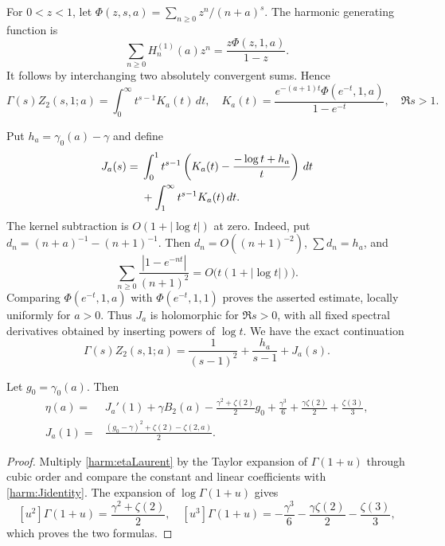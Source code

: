For $0<z<1$, let $\Phi(z,s,a)=\sum_{n\ge0}z^n/(n+a)^s$.
The harmonic generating function is
\begin{equation}\label{harm:gen}
 \sum_{n\ge0}H_n^{(1)}(a)z^n=\frac{z\Phi(z,1,a)}{1-z}.
\end{equation}
It follows by interchanging two absolutely convergent sums. Hence
\begin{equation}\label{harm:Mellin}
 \Gamma(s)Z_2(s,1;a)=\int_0^\infty t^{s-1}K_a(t)\,dt,
 \quad K_a(t)=\frac{e^{-(a+1)t}\Phi(e^{-t},1,a)}{1-e^{-t}},
 \quad \Re s>1.
\end{equation}

Put $h_a=\gamma_0(a)-\gamma$ and define
\begin{align}\label{harm:J}
 J_a(s)={}&\int_0^1t^{s-1}
       \left(K_a(t)-\frac{-\log t+h_a}{t}\right)\,dt\notag\\
 &+\int_1^\infty t^{s-1}K_a(t)\,dt.
\end{align}
The kernel subtraction is $O(1+|\log t|)$ at zero. Indeed, put
$d_n=(n+a)^{-1}-(n+1)^{-1}$. Then $d_n=O((n+1)^{-2})$,
$\sum d_n=h_a$, and
\[
 \sum_{n\ge0}\frac{|1-e^{-nt}|}{(n+1)^2}
        =O\bigl(t(1+|\log t|)\bigr).
\]
Comparing $\Phi(e^{-t},1,a)$ with $\Phi(e^{-t},1,1)$ proves the
asserted estimate, locally uniformly for $a>0$.
Thus $J_a$ is holomorphic for
$\Re s>0$, with all fixed spectral derivatives obtained by inserting
powers of $\log t$. We have the exact continuation
\begin{equation}\label{harm:Jidentity}
 \Gamma(s)Z_2(s,1;a)=\frac1{(s-1)^2}+
                 \frac{h_a}{s-1}+J_a(s).
\end{equation}

\begin{proposition}
\label{harm:etaIntegral}
Let $g_0=\gamma_0(a)$. Then
\begin{align}\label{harm:etaintegral}
 \eta(a)={}&J_a'(1)+\gamma B_2(a)
 -\frac{\gamma^2+\zeta(2)}2g_0
 +\frac{\gamma^3}6+\frac{\gamma\zeta(2)}2+\frac{\zeta(3)}3,\\
 J_a(1)={}&\frac{(g_0-\gamma)^2+\zeta(2)-\zeta(2,a)}2.\label{harm:Jone}
\end{align}
\end{proposition}
\begin{proof}
Multiply \eqref{harm:etaLaurent} by the Taylor expansion of
$\Gamma(1+u)$ through cubic order and compare the constant and linear
coefficients with \eqref{harm:Jidentity}. The expansion of
$\log\Gamma(1+u)$ gives
\[
 [u^2]\Gamma(1+u)=\frac{\gamma^2+\zeta(2)}2,\quad
 [u^3]\Gamma(1+u)=-\frac{\gamma^3}6-
                  \frac{\gamma\zeta(2)}2-\frac{\zeta(3)}3,
\]
which proves the two formulas.
\end{proof}

